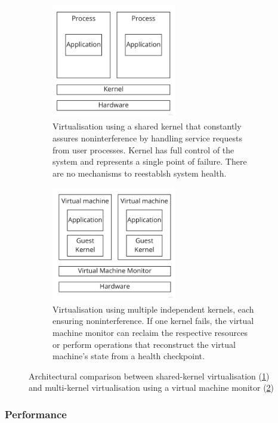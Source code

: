 \begin{figure}
\centering
    \begin{subfigure}[b]{0.45\textwidth}
        \centering
        \includegraphics[width=0.6\textwidth]{images/fundamentals/kernel-virt-arch.jpg}
        \caption{Virtualisation using a shared kernel that constantly assures noninterference by 
                handling service requests from user processes. Kernel has full control of the system
                and represents a single point of failure. There are no mechanisms to reestablsh 
                system health.}
        \label{images:fundamentals/kernel-virt-arch.jpg}
    \end{subfigure}%
    \hfill
    \begin{subfigure}[b]{0.45\textwidth}
        \centering
        \includegraphics[width=0.6\textwidth]{images/fundamentals/full-virt-arch.jpg}
        \caption{Virtualisation using multiple independent kernels, each ensuring noninterference. 
                If one kernel fails, the virtual machine monitor can reclaim the respective resources or 
                perform operations that reconstruct the virtual machine's state from a health checkpoint.}
        \label{images:fundamentals/full-virt-arch.jpg}
    \end{subfigure}
\caption{Architectural comparison between shared-kernel virtualisation (\ref{images:fundamentals/kernel-virt-arch.jpg})
         and multi-kernel virtualisation using a virtual machine monitor (\ref{images:fundamentals/full-virt-arch.jpg})}
\label{images:fundamentals/virt-arch}
\end{figure}
\subsubsection{Performance}
